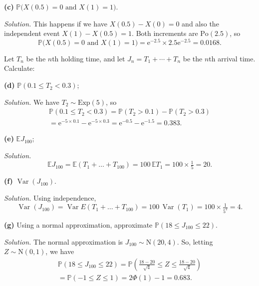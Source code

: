 \documentclass[
  a4paper,
]{article}
\theoremstyle{definition}
\theoremstyle{definition}
\theoremstyle{definition}
\theoremstyle{remark}
\begin{document}
\textbf{(c)} \(\mathbb P\big(X(0.5) = 0 \text{ and } X(1) = 1\big)\).

\begin{myanswers}
\emph{Solution.}
This happens if we have \(X(0.5) - X(0) = 0\) and also the independent event \(X(1) - X(0.5) = 1\). Both increments are \(\text{Po}(2.5)\), so
\[\mathbb P\big(X(0.5) = 0 \text{ and } X(1) = 1\big) = \mathrm{e}^{-2.5} \times 2.5\mathrm{e}^{-2.5} = 0.0168.  \]

\end{myanswers}

Let \(T_n\) be the \(n\)th holding time, and let \(J_n = T_1 + \cdots + T_n\) be the \(n\)th arrival time. Calculate:

\textbf{(d)} \(\mathbb P(0.1 \leq T_2 < 0.3)\);

\begin{myanswers}
\emph{Solution.} We have \(T_2 \sim \text{Exp}(5)\), so
\begin{multline*} \mathbb P(0.1 \leq T_2 < 0.3) = \mathbb P(T_2 > 0.1) - \mathbb P(T_2 > 0.3) \\= \mathrm{e}^{-5\times0.1} - \mathrm{e}^{-5\times0.3} = \mathrm{e}^{-0.5} - \mathrm{e}^{-1.5} = 0.383.       \end{multline*}

\end{myanswers}

\textbf{(e)} \(\mathbb E J_{100}\);

\begin{myanswers}
\emph{Solution.}
\[ \mathbb E J_{100} = \mathbb E (T_1 + \dots + T_{100}) = 100 \, \mathbb ET_1 = 100 \times \tfrac15 = 20.     \]

\end{myanswers}

\textbf{(f)} \(\operatorname{Var}(J_{100})\).

\begin{myanswers}
\emph{Solution.}
Using independence,
\[ \operatorname{Var}( J_{100}) = \operatorname{Var}E (T_1 + \dots + T_{100}) = 100 \, \operatorname{Var}(T_1) = 100 \times \tfrac1{5^2} = 4.     \]

\end{myanswers}

\textbf{(g)} Using a normal approximation, approximate \(\mathbb P(18 \leq J_{100} \leq 22)\).

\begin{myanswers}
\emph{Solution.}
The normal approximation is \(J_{100} \sim \mathrm N(20,4)\). So, letting \(Z \sim \text{N}(0,1)\), we have
\begin{multline*}  \mathbb P(18 \leq J_{100} \leq 22) = \mathbb P\left(\frac{18-20}{\sqrt4} \leq Z \leq \frac{18-20}{\sqrt4}\right) \\ = \mathbb P(-1 \leq Z \leq 1) = 2\Phi(1) - 1 = 0.683.  \end{multline*}

\end{myanswers}
\end{document}
